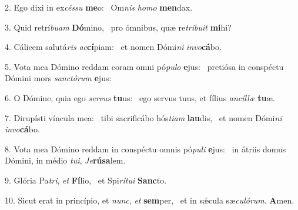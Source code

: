 2. Ego dixi in ex\textit{cés}\textit{su} \textbf{me}o: \ast\  Om\textit{nis} \textit{ho}\textit{mo} \textbf{men}dax.\

3. Quid retrí\textit{bu}\textit{am} \textbf{Dó}mino, \ast\  pro ómnibus, quæ re\textit{trí}\textit{bu}\textit{it} \textbf{mi}hi?\

4. Cálicem salutá\textit{ris} \textit{ac}\textbf{cí}piam: \ast\  et nomen Dómi\textit{ni} \textit{in}\textit{vo}\textbf{cá}bo.\

5. Vota mea Dómino reddam coram omni pó\textit{pu}\textit{lo} \textbf{e}jus: \ast\  pretiósa in conspéctu Dómini mors \textit{sanc}\textit{tó}\textit{rum} \textbf{e}jus:\

6. O Dómine, quia ego \textit{ser}\textit{vus} \textbf{tu}us: \ast\  ego servus tuus, et fílius \textit{an}\textit{cíl}\textit{læ} \textbf{tu}æ.\

7. Dirupísti víncula mea: \dag\  tibi sacrificábo hós\textit{ti}\textit{am} \textbf{lau}dis, \ast\  et nomen Dómi\textit{ni} \textit{in}\textit{vo}\textbf{cá}bo.\

8. Vota mea Dómino reddam in conspéctu omnis pó\textit{pu}\textit{li} \textbf{e}jus: \ast\  in átriis domus Dómini, in médio \textit{tu}\textit{i}, \textit{Je}\textbf{rú}\textbf{sa}lem.\

9. Glória Pa\textit{tri}, \textit{et} \textbf{Fí}lio, \ast\  et Spi\textit{rí}\textit{tu}\textit{i} \textbf{Sanc}to.\

10. Sicut erat in princípio, et \textit{nunc}, \textit{et} \textbf{sem}per, \ast\  et in sǽcula sæ\textit{cu}\textit{ló}\textit{rum}. \textbf{A}men.\

